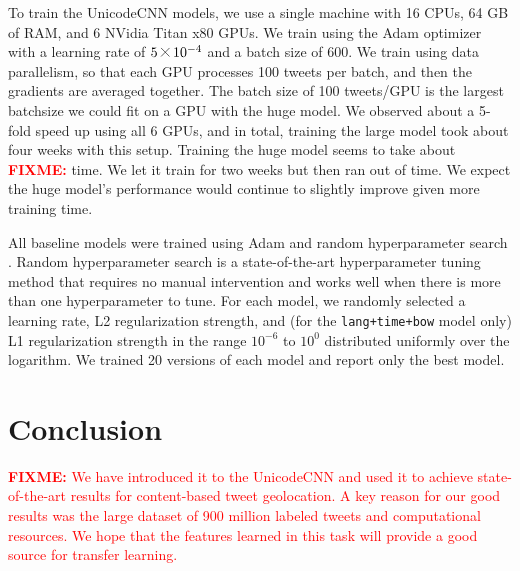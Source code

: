 \documentclass[sigconf,10pt]{acmart}
\renewcommand{\times}{\mathbin{\tikz [x=1.4ex,y=1.4ex,line width=.1ex] \draw (0,0) -- (1,1) (0,1) -- (1,0);}}%
\newcommand{\str}[1]{\texttt{#1}}
\newcommand{\fixme}[1]{\textcolor{red}{\textbf{FIXME:} {#1}}}
\begin{document}
\begin{description}
To train the UnicodeCNN models,
we use a single machine with 16 CPUs, 64 GB of RAM, and 6 NVidia Titan x80 GPUs. 
We train using the Adam optimizer \citep{kingma2014adam} with a learning rate of $5\times10^{-4}$ and a batch size of 600.
We train using data parallelism, so that each GPU processes 100 tweets per batch, 
and then the gradients are averaged together.
The batch size of 100 tweets/GPU is the largest batchsize we could fit on a GPU with the huge model.
We observed about a 5-fold speed up using all 6 GPUs,
and in total, training the large model took about four weeks with this setup.
Training the huge model seems to take about \fixme{} time.
We let it train for two weeks but then ran out of time.
We expect the huge model's performance would continue to slightly improve given more training time.

All baseline models were trained using Adam \citep{kingma2014adam} and random hyperparameter search \citep{bergstra2012random}.
Random hyperparameter search is a state-of-the-art hyperparameter tuning method that requires no manual intervention and works well when there is more than one hyperparameter to tune.
For each model, we randomly selected a learning rate, L2 regularization strength, and (for the \str{lang+time+bow} model only) L1 regularization strength in the range $10^{-6}$ to $10^0$ distributed uniformly over the logarithm.
We trained 20 versions of each model and report only the best model.

\end{description}


\section{Conclusion}

\fixme{
We have introduced it to the UnicodeCNN and used it to achieve state-of-the-art results for content-based tweet geolocation.
A key reason for our good results was the large dataset of 900 million labeled tweets and computational resources.
We hope that the features learned in this task will provide a good source for transfer learning.
}
\end{document}
